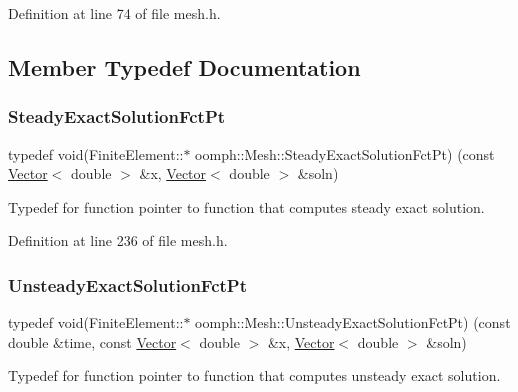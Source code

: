 Definition at line 74 of file mesh.\+h.



\subsection{Member Typedef Documentation}
\mbox{\label{classoomph_1_1Mesh_a059e155da2b47cc94c3306398bd2be07}} 
\subsubsection{\texorpdfstring{Steady\+Exact\+Solution\+Fct\+Pt}{SteadyExactSolutionFctPt}}
{\footnotesize\ttfamily typedef void(Finite\+Element\+::$\ast$ oomph\+::\+Mesh\+::\+Steady\+Exact\+Solution\+Fct\+Pt) (const \hyperlink{classoomph_1_1Vector}{Vector}$<$ double $>$ \&x, \hyperlink{classoomph_1_1Vector}{Vector}$<$ double $>$ \&soln)}



Typedef for function pointer to function that computes steady exact solution. 



Definition at line 236 of file mesh.\+h.

\mbox{\label{classoomph_1_1Mesh_a4fccd0b52d2384b0d4f423118284882d}} 
\subsubsection{\texorpdfstring{Unsteady\+Exact\+Solution\+Fct\+Pt}{UnsteadyExactSolutionFctPt}}
{\footnotesize\ttfamily typedef void(Finite\+Element\+::$\ast$ oomph\+::\+Mesh\+::\+Unsteady\+Exact\+Solution\+Fct\+Pt) (const double \&time, const \hyperlink{classoomph_1_1Vector}{Vector}$<$ double $>$ \&x, \hyperlink{classoomph_1_1Vector}{Vector}$<$ double $>$ \&soln)}



Typedef for function pointer to function that computes unsteady exact solution. 



